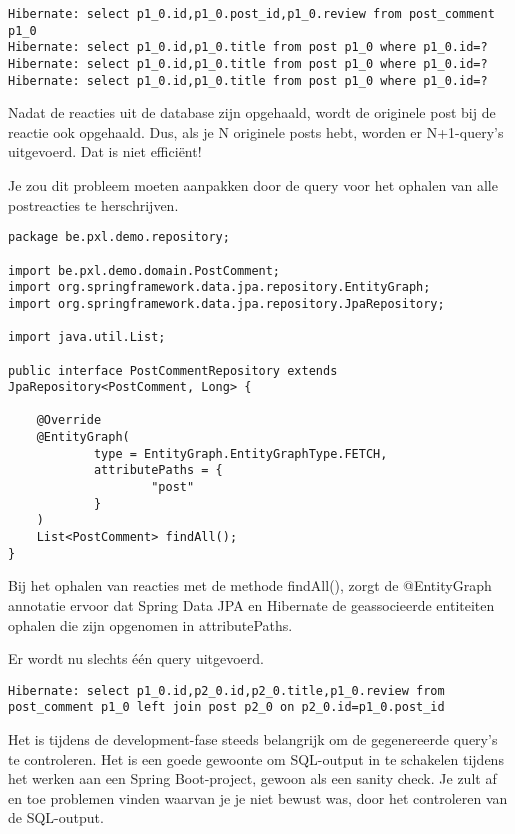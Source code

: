 \begin{lstlisting}
Hibernate: select p1_0.id,p1_0.post_id,p1_0.review from post_comment p1_0
Hibernate: select p1_0.id,p1_0.title from post p1_0 where p1_0.id=?
Hibernate: select p1_0.id,p1_0.title from post p1_0 where p1_0.id=?
Hibernate: select p1_0.id,p1_0.title from post p1_0 where p1_0.id=?
\end{lstlisting}

Nadat de reacties uit de database zijn opgehaald, wordt de originele post bij de reactie ook opgehaald. Dus, als je N originele posts hebt,  worden er N+1-query's uitgevoerd. Dat is niet efficiënt!

Je zou dit probleem moeten aanpakken door de query voor het ophalen van alle postreacties te herschrijven.

\begin{lstlisting}
package be.pxl.demo.repository;

import be.pxl.demo.domain.PostComment;
import org.springframework.data.jpa.repository.EntityGraph;
import org.springframework.data.jpa.repository.JpaRepository;

import java.util.List;

public interface PostCommentRepository extends JpaRepository<PostComment, Long> {

    @Override
    @EntityGraph(
            type = EntityGraph.EntityGraphType.FETCH,
            attributePaths = {
                    "post"
            }
    )
    List<PostComment> findAll();
}
\end{lstlisting}

Bij het ophalen van reacties met de methode findAll(), zorgt de @EntityGraph annotatie ervoor dat Spring Data JPA en Hibernate de geassocieerde entiteiten ophalen die zijn opgenomen in attributePaths.

Er wordt nu slechts één query uitgevoerd.

\begin{lstlisting}
Hibernate: select p1_0.id,p2_0.id,p2_0.title,p1_0.review from post_comment p1_0 left join post p2_0 on p2_0.id=p1_0.post_id
\end{lstlisting}

Het is tijdens de development-fase steeds belangrijk om de gegenereerde query's te controleren.  Het is een goede gewoonte om SQL-output in te schakelen tijdens het werken aan een Spring Boot-project, gewoon als een sanity check.
Je zult af en toe problemen vinden waarvan je je niet bewust was, door het controleren van de SQL-output.

